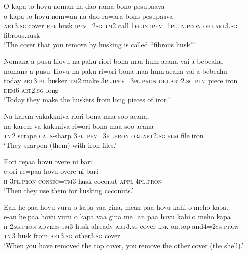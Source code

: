 \ea\label{ex:text01-63}
O kapa to hovu noman na dao raara bono pesupaava\\
\gll o	kapa	to	hovu	nom=an	na	dao	ra=ara	bono	pesupaava\\
     \textsc{art}3.\textsc{sg}	cover	\textsc{rel}	husk	\textsc{ipfv}=2\textsc{sg}	\textsc{tm}2	call	1\textsc{pl}.\textsc{in}.\textsc{ipfv}=1\textsc{pl}.\textsc{in}.\textsc{pron}	\textsc{obj}.\textsc{art}3.\textsc{sg}	fibrous.husk\\
\glt `The cover that you remove by husking is called ``fibrous husk''.'
\z

\newpage
\ea\label{ex:text01-64}
Nomana a pusu hiovu na paku riori bona maa hum aeana vai a bebeahu.\\
\gll nomana	a	pusu~hiovu	na	paku	ri=ori	bona	maa	hum	aeana	vai	a	bebeahu\\
     today	\textsc{art}3.\textsc{pl}	husker	\textsc{tm}2	make	3\textsc{pl}.\textsc{ipfv}=3\textsc{pl}.\textsc{pron}	\textsc{obj}.\textsc{art}2.\textsc{sg}	\textsc{plm}	piece	iron	\textsc{dem}6	\textsc{art}2.\textsc{sg}	long\\
\glt `Today they make the huskers from long pieces of iron.'
\z

\ea\label{ex:text01-65}
Na karem vakakaniva riori bona maa soo aeana.\\
\gll na	karem	va-kakaniva	ri=ori	bona	maa	soo	aeana\\
     \textsc{tm}2	scrape	\textsc{caus}-sharp	3\textsc{pl}.\textsc{ipfv}=3\textsc{pl}.\textsc{pron}	\textsc{obj}.\textsc{art}2.\textsc{sg}	\textsc{plm}	file	iron\\
\glt `They sharpen (them) with iron files.'
\z

\ea\label{ex:text01-66}
Eori repaa hovu overe ni bari.\\
\gll e-ori	re=paa	hovu	overe	ni	bari\\
     \textsc{h}-3\textsc{pl}.\textsc{pron}	\textsc{consec}=\textsc{tm}3	husk	coconut	\textsc{appl}	4\textsc{pl}.\textsc{pron}\\
\glt `Then they use them for husking coconuts.'
\z

\ea\label{ex:text01-67}
Ean he paa hovu vuru o kapa vaa gina, mean paa hovu kahi o meho kapa.\\
\gll e-an	he	paa	hovu	vuru	o	kapa	vaa	gina	me=an	paa	hovu	kahi	o	meho	kapa\\
     \textsc{h}-2\textsc{sg}.\textsc{pron}	\textsc{advers}	\textsc{tm}3	husk	already	\textsc{art}3.\textsc{sg}	cover	\textsc{lnk}	on.top	and4=2\textsc{sg}.\textsc{pron}	\textsc{tm}3	husk	from	\textsc{art}3.\textsc{sg}	other3.\textsc{sg}	cover\\
\glt `When you have removed the top cover, you remove the other cover (the shell).'
\z

